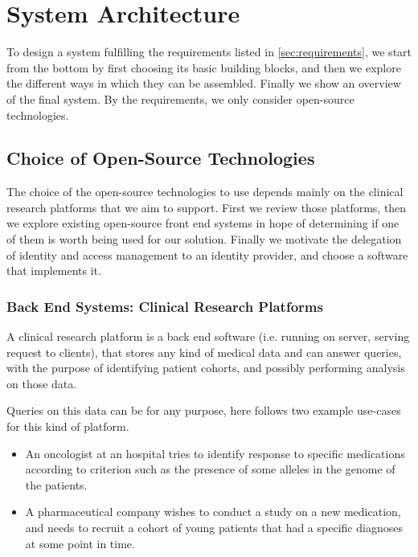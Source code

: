 \chapter{System Architecture}
\label{sec:sysarchitecture}

To design a system fulfilling the requirements listed in \ref{sec:requirements}, we start from the bottom by first choosing its basic building blocks, and then we explore the different ways in which they can be assembled.
Finally we show an overview of the final system.
By the requirements, we only consider open-source technologies.


\section{Choice of Open-Source Technologies}

The choice of the open-source technologies to use depends mainly on the clinical research platforms that we aim to support.
First we review those platforms, then we explore existing open-source front end systems in hope of determining if one of them is worth being used for our solution.
Finally we motivate the delegation of identity and access management to an identity provider, and choose a software that implements it.

\subsection{Back End Systems: Clinical Research Platforms}

A clinical research platform is a back end software (i.e. running on server, serving request to clients), that stores any kind of medical data and can answer queries, with the purpose of identifying patient cohorts, and possibly performing analysis on those data.

Queries on this data can be for any purpose, here follows two example use-cases for this kind of platform.
\begin{itemize}
    \item An oncologist at an hospital tries to identify response to specific medications according to criterion such as the presence of some alleles in the genome of the patients.
    \item A pharmaceutical company wishes to conduct a study on a new medication, and needs to recruit a cohort of young patients that had a specific diagnoses at some point in time.
\end{itemize}

